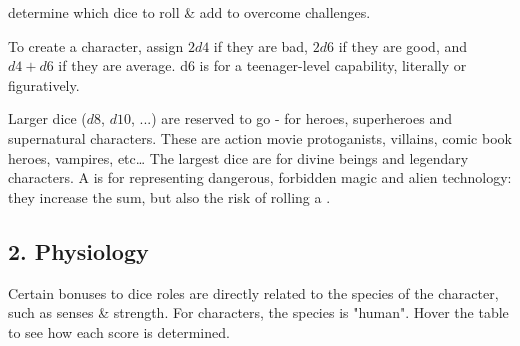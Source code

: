 \documentclass{LegrandOrangeTufteBook}
\begin{document}
 determine which dice to roll \& add
to overcome challenges.

To create a  character,
\marginpar{
	\footnotesize
	
}
assign $2d4$ if they are bad,
$2d6$ if they are good, and $d4 + d6$ if they are average.
d6 is for a teenager-level capability, literally or figuratively.

Larger dice ($d8$, $d10$, ...) are reserved to go  - for heroes, superheroes and supernatural characters.
These are action movie protoganists, villains, comic book heroes, vampires, etc\dots
The largest dice are for divine beings and legendary characters.
A  is for representing dangerous, forbidden magic and alien technology:
they increase the sum, but also the risk of rolling a .


\subsection*{2. Physiology}
Certain bonuses to dice roles are directly related to the species of the character, such as senses \& strength.
For  characters, the species is "human".
Hover the table to see how each score is determined.

\begin{figure}[H]
	\centering
\end{figure}

\end{document}
